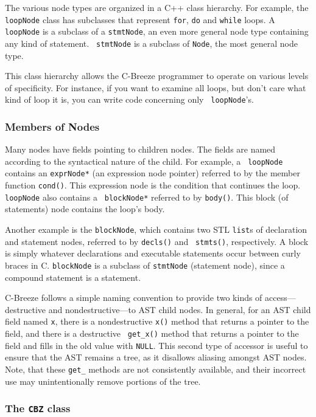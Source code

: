 \documentclass[10pt]{article}
\begin{document}
The various node types are organized in a C++ class hierarchy.  For example,
the {\tt loopNode} class has subclasses that represent {\tt for}, {\tt do}
and {\tt while} loops.  A {\tt loopNode} is a subclass of a {\tt stmtNode},
an even more general node type containing any kind of statement.  {\tt
stmtNode} is a subclass of {\tt Node}, the most general node type.

This class hierarchy allows the C-Breeze programmer to operate on various
levels of specificity.  For instance, if you want to examine all loops, but
don't care what kind of loop it is, you can write code concerning only {\tt
loopNode}'s.

\subsubsection{Members of Nodes}

Many nodes have fields pointing to children nodes.  The fields are named
according to the syntactical nature of the child.  For example, a {\tt
loopNode} contains an {\tt exprNode*} (an expression node pointer) referred
to by the member function {\tt cond()}.  This expression node is the
condition that continues the loop.  {\tt loopNode} also contains a {\tt
blockNode*} referred to by {\tt body()}.  This block (of statements) node
contains the loop's body.

Another example is the {\tt blockNode}, which contains two STL {\tt list}s of
declaration and statement nodes, referred to by {\tt decls()} and {\tt
stmts()}, respectively.  A block is simply whatever declarations and
executable statements occur between curly braces in C. {\tt blockNode} is a
subclass of {\tt stmtNode} (statement node), since a compound statement is a
statement.

C-Breeze follows a simple naming convention to provide two kinds of
access---destructive and nondestructive---to AST child nodes.  In general,
for an AST child field named {\tt x}, there is a nondestructive {\tt x()}
method that returns a pointer to the field, and there is a destructive {\tt
get\_x()} method that returns a pointer to the field and fills in the old
value with {\tt NULL}.  This second type of accessor is useful to ensure that
the AST remains a tree, as it disallows aliasing amongst AST nodes.  Note,
that these {\tt get\_} methods are not consistently available, and their
incorrect use may unintentionally remove portions of the tree.

\subsubsection{The {\tt CBZ} class}
\end{document}

